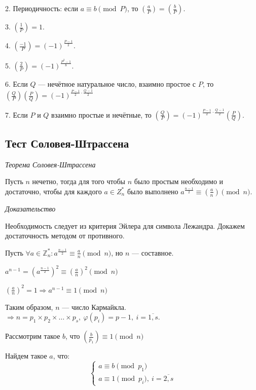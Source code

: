 \documentclass[bachelor, och, labwork]{shiza}
\begin{document}
2. Периодичность: если $a\equiv b{\pmod {P}}$, то $\left({\frac {a}{P}}\right)=\left({\frac {b}{P}}\right)$.

3. $\left({\frac {1}{P}}\right)=1$.

4. $\left({\frac {-1}{P}}\right)=(-1)^{\frac {P-1}{2}}$.

5. $\left({\frac {2}{P}}\right)=(-1)^{\frac {P^{2}-1}{8}}$.

6. Если $Q$ --- нечётное натуральное число, взаимно простое с $P$, то 
$\left({\frac {Q}{P}}\right)\left({\frac {P}{Q}}\right)=(-1)^{{\frac {P-1}{2}}\cdot {\frac {Q-1}{2}}}$

7. Если $P$ и $Q$ взаимно простые и нечётные, то $\left({\frac {Q}{P}}\right)=(-1)^{{\frac {P-1}{2}}\cdot {\frac {Q-1}{2}}}\left({\frac {P}{Q}}\right)$.

\subsection{Тест Соловея-Штрассена}

\begin{center}
    \textit{Теорема Соловея-Штрассена}
\end{center}

Пусть $n$ нечетно, тогда для того чтобы $n$ было простым необходимо и достаточно, 
чтобы для каждого $a\in Z^*_n$ было выполнено $a^{\frac{n-1}{2}}\equiv \left({\frac {a}{n}}\right)\pmod n$.

\begin{center}
    \textit{Доказательство}
\end{center}

Необходимость следует из критерия Эйлера для символа Лежандра. Докажем достаточность 
методом от противного.

Пусть $\forall a \in \mathbb{Z}^*_n : a^{\frac{n-1}{2}}\equiv\frac{a}{n} \pmod n$, 
но $n$ --- составное.

$a^{n-1} = (a^{\frac{n-1}{2}})^2\equiv\left(\frac{a}{n}\right)^2\pmod n$

$\left(\frac{a}{n}\right)^2 = 1 \Rightarrow a ^{n-1}\equiv 1 \pmod n$

Таким образом, $n$ --- число Кармайкла. $\Rightarrow n = p_1 \times p_2 \times \ldots \times p_s, ~\varphi(p_i) = p - 1, ~i=\overline{1,s}$.

Рассмотрим такое $b$, что $\left(\frac{b}{p_1}\right)\equiv 1 \pmod n$

Найдем такое $a$, что:
\begin{equation}
    \begin{cases}
        a \equiv b \pmod {p_1} \\

        a \equiv 1 \pmod {p_i},~ i =\overline{2,s} 
    \end{cases}
\end{equation}
\end{document}
